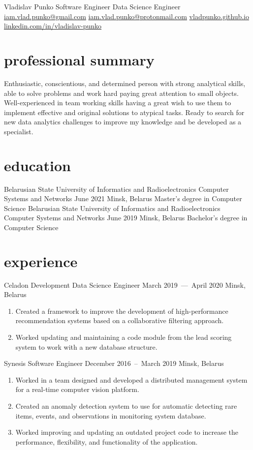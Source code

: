 \documentclass{punko-resume}
\begin{document}
\resumeheader
{Vladislav}
{Punko}
{Software Engineer}
{Data Science Engineer}
{\href{mailto:iam.vlad.punko@gmail.com}{iam.vlad.punko@gmail.com}}
{\href{mailto:iam.vlad.punko@protonmail.com}{iam.vlad.punko@protonmail.com}}
{\href{https://vladpunko.github.io}{vladpunko.github.io}}
{\href{https://linkedin.com/in/vladislav-punko}{linkedin.com/in/vladislav-punko}}

\begin{minipage}[t]{0.65\textwidth}

\section{professional summary}
\begin{textsection}
Enthusiastic, conscientious, and determined person with strong analytical skills, able to solve problems and work hard paying great attention to small objects.
Well-experienced in team working skills having a great wish to use them to implement effective and original solutions to atypical tasks.
Ready to search for new data analytics challenges to improve my knowledge and be developed as a specialist.
\end{textsection}

\section{education}
\education
{Belarusian State University of Informatics and Radioelectronics}
{Computer Systems and Networks}
{June 2021}
{Minsk, Belarus}
{Master's degree in Computer Science}
\education
{Belarusian State University of Informatics and Radioelectronics}
{Computer Systems and Networks}
{June 2019}
{Minsk, Belarus}
{Bachelor's degree in Computer Science}

\section{experience}
\experience
{Celadon Development}
{Data Science Engineer}
{March 2019~---~April 2020}
{Minsk, Belarus}
\begin{enumerate}
\item Created a framework to improve the development of high-performance recommendation systems based on a collaborative filtering approach.
\item Worked updating and maintaining a code module from the lead scoring system to work with a new database structure.
\end{enumerate}
\experience
{Synesis}
{Software Engineer}
{December 2016~--~March 2019}
{Minsk, Belarus}
\begin{enumerate}
\item Worked in a team designed and developed a distributed management system for a real-time computer vision platform.
\item Created an anomaly detection system to use for automatic detecting rare items, events, and observations in monitoring system database.
\item Worked improving and updating an outdated project code to increase the performance, flexibility, and functionality of the application.
\end{enumerate}


\end{minipage}
\end{document}
